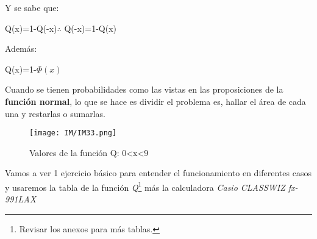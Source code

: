 \documentclass[
	12pt, %
	fleqn, %
	a4paper, %
	oneside, %
]{LegrandOrangeBook}
\begin{document}
Y se sabe que:
\begin{theorem}
Q(x)=1-Q(-x)$\therefore$ Q(-x)=1-Q(x)
\label{theo:neg q}
\end{theorem}
Además:
\begin{theorem}
Q(x)=1-$\Phi(x)$
\end{theorem}
\begin{remark}
Cuando se tienen probabilidades como las vistas en las proposiciones de la \textbf{función normal}, lo que se hace es dividir el problema es, hallar el área de cada una y restarlas o sumarlas.
\end{remark}
\begin{figure}[]
\centering
\texttt{[image: IM/IM33.png]}
\caption{Valores de la función Q: 0<x<9}
\label{fig:tabla funq}
\end{figure}
Vamos a ver 1 ejercicio básico para entender el funcionamiento en diferentes casos y usaremos la tabla de la función \textit{Q}\footnote{Revisar los anexos para más tablas.} más la calculadora \textit{Casio CLASSWIZ fx-991LAX}
\end{document}
